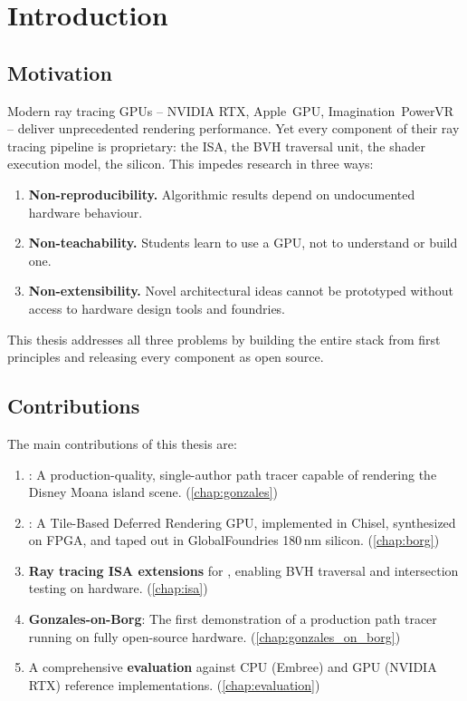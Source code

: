 \chapter{Introduction}
\label{chap:introduction}

\section{Motivation}

Modern ray tracing GPUs -- NVIDIA RTX, Apple~GPU, Imagination~PowerVR --
deliver unprecedented rendering performance.
Yet every component of their ray tracing pipeline is proprietary:
the ISA, the BVH traversal unit, the shader execution model, the silicon.
This impedes research in three ways:
\begin{enumerate}
  \item \textbf{Non-reproducibility.} Algorithmic results depend on
    undocumented hardware behaviour.
  \item \textbf{Non-teachability.} Students learn to use a GPU, not
    to understand or build one.
  \item \textbf{Non-extensibility.} Novel architectural ideas cannot be
    prototyped without access to hardware design tools and foundries.
\end{enumerate}

This thesis addresses all three problems by building the entire stack
from first principles and releasing every component as open source.

\section{Contributions}

The main contributions of this thesis are:

\begin{enumerate}
  \item \textbf{\gonzales{}}: A production-quality, single-author
    path tracer capable of rendering the Disney Moana island scene.
    (\autoref{chap:gonzales})

  \item \textbf{\borg{}}: A Tile-Based Deferred Rendering GPU,
    implemented in Chisel, synthesized on FPGA, and taped out in
    GlobalFoundries 180\,nm silicon.
    (\autoref{chap:borg})

  \item \textbf{Ray tracing ISA extensions} for \borg{},
    enabling BVH traversal and intersection testing on hardware.
    (\autoref{chap:isa})

  \item \textbf{Gonzales-on-Borg}: The first demonstration of a
    production path tracer running on fully open-source hardware.
    (\autoref{chap:gonzales_on_borg})

  \item A comprehensive \textbf{evaluation} against CPU (Embree) and
    GPU (NVIDIA RTX) reference implementations.
    (\autoref{chap:evaluation})
\end{enumerate}


